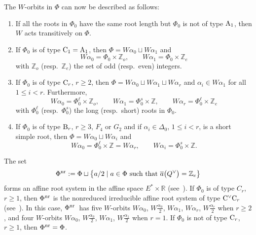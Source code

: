 \documentclass[11pt]{article}
\numberwithin{equation}{section}
\numberwithin{equation}{section}
\begin{document}
The $W$-orbits in $\Phi$ can now be described as follows:
\begin{enumerate}\itemsep=0pt
\item[$(1)$] If all the roots in $\Phi_0$ have the same root length but $\Phi_0$ is not of type $\textup{A}_1$, then $W$ acts transitively on $\Phi$.
\item[$(2)$] If $\Phi_0$ is of type ${\rm C}_1=\textup{A}_1$, then $\Phi=W\alpha_0\sqcup W\alpha_1$ and
\[
W\alpha_0=\Phi_0\times\mathbb{Z}_o,\qquad W\alpha_1=\Phi_0\times\mathbb{Z}_e
\]
with $\mathbb{Z}_o$ (resp.\ $\mathbb{Z}_e$) the set of odd (resp.\ even) integers.
\item[$(3)$] If $\Phi_0$ is of type ${\rm C}_r$, $r\geq 2$, then $\Phi=W\alpha_0\sqcup W\alpha_1\sqcup W\alpha_r$ and $\alpha_i\in W\alpha_1$ for all $1\leq i<r$. Furthermore,
\[
W\alpha_0=\Phi_0^\ell\times\mathbb{Z}_o,\qquad W\alpha_1=\Phi_0^s\times\mathbb{Z},\qquad W\alpha_r=\Phi_0^\ell\times\mathbb{Z}_e
\]
with $\Phi_0^\ell$ (resp.\ $\Phi_0^s$) the long (resp.\ short) roots in $\Phi_0$.
\item[$(4)$] If $\Phi_0$ is of type $\textup{B}_r$, $r\geq 3$, $F_4$ or $G_2$ and if $\alpha_i\in\Delta_0$, $1\leq i<r$, is a short simple root, then $\Phi=W\alpha_0\sqcup W\alpha_i$ and
\[
W\alpha_0=\Phi_0^\ell\times\mathbb{Z}=W\alpha_r,\qquad W\alpha_i=\Phi_0^s\times\mathbb{Z}.
\]
\end{enumerate}
The set
\[
\Phi^{\textup{nr}}:=\Phi\sqcup\bigl\{a/2\mid a\in\Phi\ \textup{such that}\ \overline{a}\bigl(Q^\vee\bigr)=\mathbb{Z}_e\big\}
\]
forms an affine root system in the affine space $E^*\times\mathbb{R}$ (see~\cite{MacAff}). If $\Phi_0$ is of type $C_r$, $r\geq 1$, then $\Phi^{\textup{nr}}$ is the nonreduced irreducible affine root system of type ${\rm C}^\vee{\rm C}_r$ (see~\cite{MacAff}). In this case, $\Phi^{\textup{nr}}$~has five $W$-orbits $W\alpha_0$, $W\frac{\alpha_0}{2}$, $W\alpha_1$, $W\alpha_r$, $W\frac{\alpha_r}{2}$ when $r\geq 2$, and four $W$-orbits
$W\alpha_0$, $W\frac{\alpha_0}{2}$, $W\alpha_1$, $W\frac{\alpha_1}{2}$ when $r=1$. If $\Phi_0$ is not of type ${\rm C}_r$, $r\geq 1$, then $\Phi^{\textup{nr}}=\Phi$.
\end{document}
